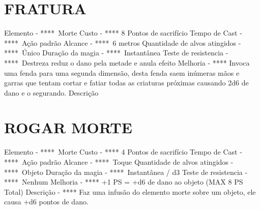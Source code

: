 \documentclass{article}%
\begin{document}
%
\section{FRATURA}%
\label{sec:FRATURA}%
Elemento {-} ****~Morte\newline%
Custo {-} **** 8 Pontos de sacrifício\newline%
Tempo de Cast {-} ****~Ação padrão\newline%
Alcance {-} ****~6 metros\newline%
Quantidade de alvos atingidos {-} ****~Único\newline%
Duração da magia {-} ****~Instantânea\newline%
Teste de resistencia {-} ****~Destreza reduz o dano pela metade e anula efeito\newline%
Melhoria {-} **** Invoca uma fenda para uma segunda dimensão, desta fenda saem inúmeras mãos e garras que tentam cortar e fatiar todas as criaturas próximas causando 2d6 de dano e o segurando.\newline%
Descrição \newline%

%
\section{ROGAR MORTE}%
\label{sec:ROGARMORTE}%
Elemento {-} ****~Morte\newline%
Custo {-} **** 4 Pontos de sacrifício\newline%
Tempo de Cast {-} ****~Ação padrão\newline%
Alcance {-} ****~Toque\newline%
Quantidade de alvos atingidos {-} ****~Objeto\newline%
Duração da magia {-} ****~Instantânea / d3\newline%
Teste de resistencia {-} ****~Nenhum\newline%
Melhoria {-} **** +1 PS = +d6 de dano ao objeto (MAX 8 PS Total)\newline%
Descrição {-} **** Faz uma infusão do elemento morte sobre um objeto, ele causa +d6 pontos de dano.\newline%

%
\end{document}
